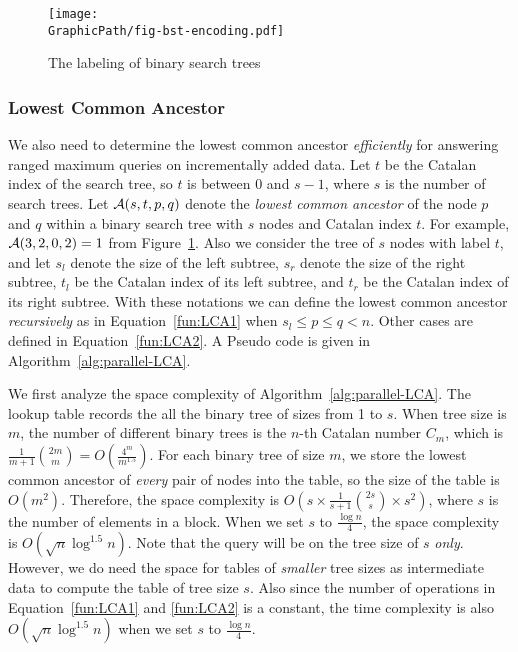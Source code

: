 \begin{figure}[!thb]
  \centering
  \texttt{[image: \\GraphicPath/fig-bst-encoding.pdf]}
  \caption{The labeling of binary search trees}
  \label{fig:labelingBST}
\end{figure}

\subsubsection{Lowest Common Ancestor}

We also need to determine the lowest common ancestor {\em efficiently}
for answering ranged maximum queries on incrementally added data.  Let
$t$ be the Catalan index of the search tree, so $t$ is between 0 and
$s - 1$, where $s$ is the number of search trees.  Let ${\cal A}(s, t,
p, q)$ denote the {\em lowest common ancestor} of the node $p$ and $q$
within a binary search tree with $s$ nodes and Catalan index $t$.  For
example, ${\cal A}(3, 2, 0, 2) = 1$ from Figure~\ref{fig:labelingBST}.
Also we consider the tree of $s$ nodes with label $t$, and let $s_l$
denote the size of the left subtree, $s_r$ denote the size of the
right subtree, $t_l$ be the Catalan index of its left subtree, and
$t_r$ be the Catalan index of its right subtree.  With these notations
we can define the lowest common ancestor {\em recursively} as in
Equation~\ref{fun:LCA1} when $s_l \le p \le q < n$.  Other cases are
defined in Equation~\ref{fun:LCA2}.  A Pseudo code is given in
Algorithm~\ref{alg:parallel-LCA}.





We first analyze the space complexity of
Algorithm~\ref{alg:parallel-LCA}.  The lookup table records the all
the binary tree of sizes from 1 to $s$.  When tree size is $m$, the
number of different binary trees is the $n$-th Catalan number $C_m$,
which is $\frac{1}{m+1}\binom{2m}{m} = O(\frac{4^m}{m^{1.5}})$.  For
each binary tree of size $m$, we store the lowest common ancestor of
{\em every} pair of nodes into the table, so the size of the table is
$O(m^2)$.  Therefore, the space complexity is $O(s \times
\frac{1}{s+1}\binom{2s}{s} \times s^2)$, where $s$ is the number of
elements in a block.  When we set $s$ to $\frac{\log n}{4}$, the space
complexity is $O(\sqrt{n} \log ^{1.5} n)$.  Note that the query will
be on the tree size of $s$ {\em only}.  However, we do need the space
for tables of {\em smaller} tree sizes as intermediate data to compute
the table of tree size $s$.  Also since the number of operations in
Equation~\ref{fun:LCA1} and \ref{fun:LCA2} is a constant, the time
complexity is also $O(\sqrt{n} \log ^{1.5} n)$ when we set $s$ to
$\frac{\log n}{4}$.

